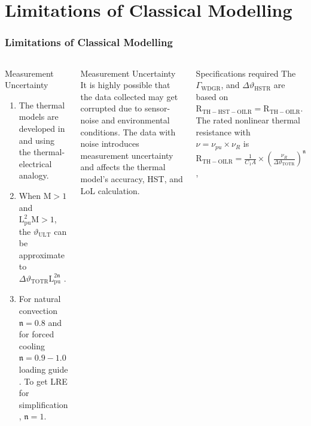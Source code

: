 \documentclass[10pt,hyperref={pdfpagelabels=false}]{beamer}
\begin{document}
\section{Limitations of Classical Modelling}
\begin{frame}[fragile]
\frametitle{Limitations of Classical Modelling}

\begin{columns}
\begin{block}{Measurement Uncertainty}
\scriptsize
\begin{enumerate}
    \item The thermal models are developed in \cite{susa} and \cite{swift} using the thermal-electrical analogy.
    \item When $\mathrm{M}>1$ and $\mathrm{L}_{\mathrm{pu}}^2 \mathrm{M}>1$, the $\vartheta_{\mathrm{ULT}}$ can be approximate to $\Delta \vartheta_{\mathrm{\mathrm{TOTR}}} \mathrm{L}_{\mathrm{pu}}^{2{\boldsymbol{\mathfrak{n}}}}$ \cite{lesieutre}.
    \item For natural convection $\boldsymbol{\mathfrak{n}}=0.8$ and for forced cooling $\boldsymbol{\mathfrak{n}}=0.9-1.0$ loading guide \cite{Pierce}. To get LRE for simplification  \cite{lesieutre}, $\boldsymbol{\mathfrak{n}}=1$.
\end{enumerate}
\end{block}
\begin{alertblock}{Measurement Uncertainty}
\scriptsize
    It is highly possible that the data collected may get corrupted due to sensor-noise and environmental conditions. The data with noise introduces measurement uncertainty and affects the thermal model's accuracy, HST, and LoL calculation. 
\end{alertblock}
\begin{alertblock}{Specifications required}
\scriptsize
The $\Gamma_{\mathrm{WDGR}}$, and $\Delta\vartheta_{\mathrm{HSTR}}$ are based on\\ $\mathrm{R}_{\mathrm{TH-HST-OILR}}= \mathrm{R}_{\mathrm{TH-OILR}}$.\\
The rated nonlinear thermal resistance with \\$\nu=\nu_{pu} \times \nu_R$ is 
   $\mathrm{R}_{\mathrm{TH-OILR}}=\frac{1}{C_1A} \times \left ( \frac{\nu_R }{\Delta\vartheta_{\mathrm{TOTR}}}\right )^{\boldsymbol{\mathfrak{n}}}$,\\


\end{alertblock}
\end{columns}
\end{frame}
\end{document}
